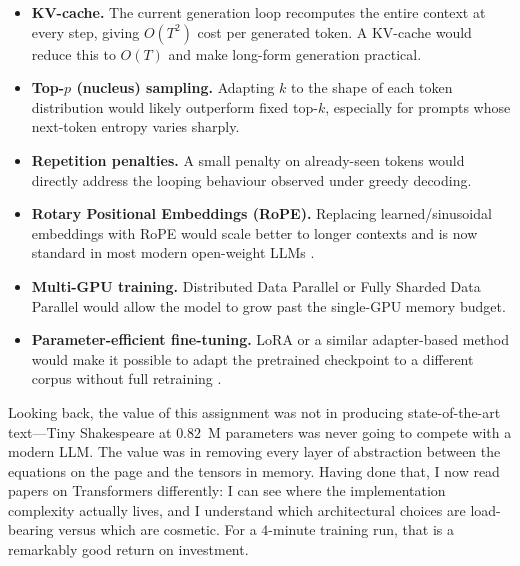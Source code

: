 \begin{itemize}
    \item \textbf{KV-cache.} The current generation loop recomputes the
          entire context at every step, giving $O(T^2)$ cost per
          generated token. A KV-cache would reduce this to $O(T)$ and
          make long-form generation practical.
    \item \textbf{Top-$p$ (nucleus) sampling.} Adapting $k$ to the shape
          of each token distribution would likely outperform fixed
          top-$k$, especially for prompts whose next-token entropy
          varies sharply.
    \item \textbf{Repetition penalties.} A small penalty on already-seen
          tokens would directly address the looping behaviour observed
          under greedy decoding.
    \item \textbf{Rotary Positional Embeddings (RoPE).} Replacing
          learned/sinusoidal embeddings with RoPE would scale better to
          longer contexts and is now standard in most modern
          open-weight LLMs \parencite{su2021roformer}.
    \item \textbf{Multi-GPU training.} Distributed Data Parallel or
          Fully Sharded Data Parallel would allow the model to grow
          past the single-GPU memory budget.
    \item \textbf{Parameter-efficient fine-tuning.} LoRA or a similar
          adapter-based method would make it possible to adapt the
          pretrained checkpoint to a different corpus without full
          retraining \parencite{hu2021lora}.
\end{itemize}

\noindent Looking back, the value of this assignment was not in producing
state-of-the-art text---Tiny Shakespeare at $0.82$~M parameters was
never going to compete with a modern LLM. The value was in removing
every layer of abstraction between the equations on the page and the
tensors in memory. Having done that, I now read papers on Transformers
differently: I can see where the implementation complexity actually
lives, and I understand which architectural choices are load-bearing
versus which are cosmetic. For a $4$-minute training run, that is a
remarkably good return on investment.